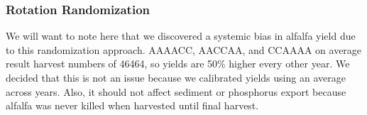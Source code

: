 \subsubsection{Rotation Randomization}
	We will want to note here that we discovered a systemic bias in alfalfa yield due to this randomization approach. AAAACC, AACCAA, and CCAAAA on average result harvest numbers of 46464, so yields are 50\% higher every other year. We decided that this is not an issue because we calibrated yields using an average across years. Also, it should not affect sediment or phosphorus export because alfalfa was never killed when harvested until final harvest.